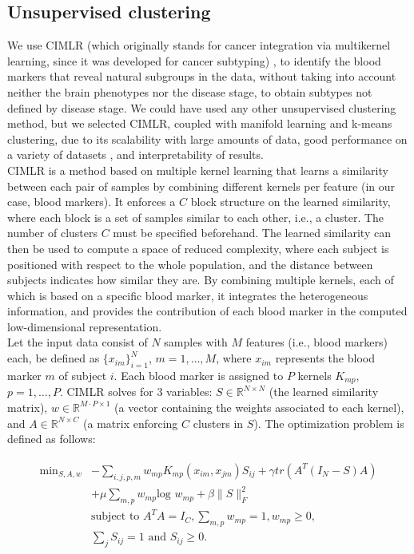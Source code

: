 \subsection{Unsupervised clustering}

We use CIMLR (which originally stands for cancer integration via multikernel learning, since it was developed for cancer subtyping) \cite{Ramazzotti2018,Wang2017a}, to identify the blood markers that reveal natural subgroups in the data, without taking into account neither the brain phenotypes nor the disease stage, to obtain subtypes not defined by disease stage. We could have used any other unsupervised clustering method, but we selected CIMLR, coupled with manifold learning and k-means clustering, due to its scalability with large amounts of data, good performance on a variety of datasets \cite{Ramazzotti2018,Wang2017a}, and interpretability of results. \\

CIMLR is a method based on multiple kernel learning that learns a similarity between each pair of samples by combining different kernels per feature (in our case, blood markers). It enforces a $C$ block structure on the learned similarity, where each block is a set of samples similar to each other, i.e., a cluster. The number of clusters $C$ must be specified beforehand. The learned similarity can then be used to compute a space of reduced complexity, where each subject is positioned with respect to the whole population, and the distance between subjects indicates how similar they are. By combining multiple kernels, each of which is based on a specific blood marker, it integrates the heterogeneous information, and provides the contribution of each blood marker in the computed low-dimensional representation. \\

Let the input data consist of $N$ samples with $M$ features (i.e., blood markers) each, be defined as $\{x_{im}\}^N_{i=1}$, $m=1,\ldots, M$, where $x_{im}$ represents the blood marker $m$ of subject $i$. Each blood marker is assigned to $P$ kernels $K_{mp}$, $p=1,\ldots, P$. CIMLR solves for 3 variables: $S \in \mathbb{R}^{N\times N}$ (the learned similarity matrix), $w \in \mathbb{R}^{M\cdot P \times 1}$ (a vector containing the weights associated to each kernel), and $A \in \mathbb{R}^{N\times C}$ (a matrix enforcing $C$ clusters in $S$). The  optimization problem is defined as follows:

\begin{align}
\begin{split}\label{eq:1}
   \text{min}_{S,A,w} {}&-\sum_{i,j,p,m}w_{mp}K_{mp}(x_{im},x_{jm})S_{ij} + \gamma tr(A^T(I_N-S)A)\\
   {}&+ \mu\sum_{m,p} w_{mp} \text{log } w_{mp} + \beta \|S\|^2_F  \\
   {}&\text{subject to } A^TA = I_C, \sum_{m,p}  w_{mp} = 1,  w_{mp} \geq 0,\\
   {}&\sum_j S_{ij} = 1 \text{ and } S_{ij} \geq 0.
\end{split}
\end{align}

